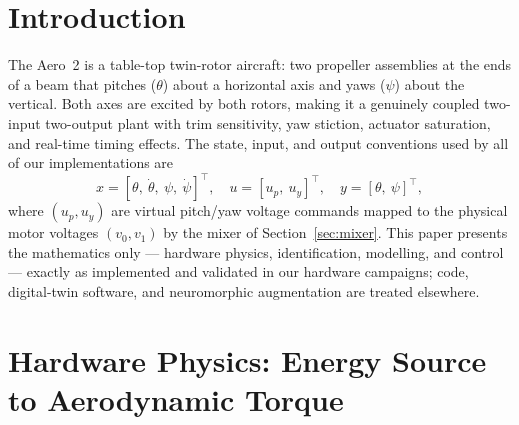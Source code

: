\documentclass[conference]{IEEEtran}
\begin{document}
\section{Introduction}
The Aero~2 is a table-top twin-rotor aircraft: two propeller assemblies at the ends of a beam that pitches ($\theta$) about a horizontal axis and yaws ($\psi$) about the vertical. Both axes are excited by both rotors, making it a genuinely coupled two-input two-output plant with trim sensitivity, yaw stiction, actuator saturation, and real-time timing effects. The state, input, and output conventions used by all of our implementations are
\begin{equation}
x = [\theta,\ \dot\theta,\ \psi,\ \dot\psi]^{\!\top},\quad
u = [u_p,\ u_y]^{\!\top},\quad
y = [\theta,\ \psi]^{\!\top},
\end{equation}
where $(u_p,u_y)$ are virtual pitch/yaw voltage commands mapped to the physical motor voltages $(v_0, v_1)$ by the mixer of Section~\ref{sec:mixer}. This paper presents the mathematics only --- hardware physics, identification, modelling, and control --- exactly as implemented and validated in our hardware campaigns; code, digital-twin software, and neuromorphic augmentation are treated elsewhere.

\section{Hardware Physics: Energy Source to Aerodynamic Torque}\label{sec:hw}
\end{document}
